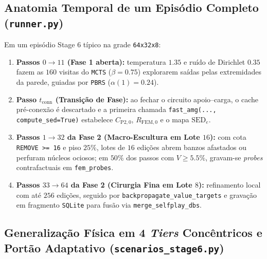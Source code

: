 \documentclass[11pt,a4paper]{article}
\begin{document}
\subsection{Anatomia Temporal de um Episódio Completo (\texttt{runner.py})}

Em um episódio Stage 6 típico na grade \texttt{64x32x8}:
\begin{enumerate}
\item \textbf{Passos $0 \to 11$ (Fase 1 aberta):} temperatura $1.35$ e ruído de Dirichlet $0.35$ fazem as $160$ visitas do \texttt{MCTS} ($\beta = 0.75$) explorarem saídas pelas extremidades da parede, guiadas por \texttt{PBRS} ($\alpha(1)=0.24$).
\item \textbf{Passo $t_{\mathrm{conn}}$ (Transição de Fase):} ao fechar o circuito apoio--carga, o cache pré-conexão é descartado e a primeira chamada \texttt{fast\_amg(..., compute\_sed=True)} estabelece $C_{\mathrm{P2,0}}$, $R_{\mathrm{FEM},0}$ e o mapa $\mathrm{SED}_e$.
\item \textbf{Passos $1 \to 32$ da Fase 2 (Macro-Escultura em Lote $16$):} com cota \texttt{REMOVE >= 16} e piso $25\%$, lotes de $16$ edições abrem banzos afastados ou perfuram núcleos ociosos; em $50\%$ dos passos com $V \ge 5.5\%$, gravam-se \emph{probes} contrafactuais em \texttt{fem\_probes}.
\item \textbf{Passos $33 \to 64$ da Fase 2 (Cirurgia Fina em Lote $8$):} refinamento local com até $256$ edições, seguido por \texttt{backpropagate\_value\_targets} e gravação em fragmento \texttt{SQLite} para fusão via \texttt{merge\_selfplay\_dbs}.
\end{enumerate}

\subsection{Generalização Física em 4 \emph{Tiers} Concêntricos e Portão Adaptativo (\texttt{scenarios\_stage6.py})}
\end{document}
